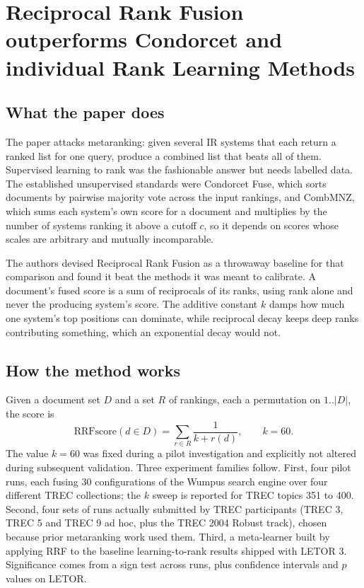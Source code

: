 \section{Reciprocal Rank Fusion outperforms Condorcet and individual Rank Learning Methods}

\subsection{What the paper does}

The paper attacks metaranking: given several IR systems that each return a ranked list for one query, produce a combined list that beats all of them. Supervised learning to rank was the fashionable answer but needs labelled data. The established unsupervised standards were Condorcet Fuse, which sorts documents by pairwise majority vote across the input rankings, and CombMNZ, which sums each system's own score for a document and multiplies by the number of systems ranking it above a cutoff $c$, so it depends on scores whose scales are arbitrary and mutually incomparable.

The authors devised Reciprocal Rank Fusion as a throwaway baseline for that comparison and found it beat the methods it was meant to calibrate. A document's fused score is a sum of reciprocals of its ranks, using rank alone and never the producing system's score. The additive constant $k$ damps how much one system's top positions can dominate, while reciprocal decay keeps deep ranks contributing something, which an exponential decay would not.

\subsection{How the method works}

Given a document set $D$ and a set $R$ of rankings, each a permutation on $1..|D|$, the score is
\[ \mathrm{RRFscore}(d \in D) = \sum_{r \in R} \frac{1}{k + r(d)}, \qquad k = 60 . \]
The value $k=60$ was fixed during a pilot investigation and explicitly not altered during subsequent validation. Three experiment families follow. First, four pilot runs, each fusing 30 configurations of the Wumpus search engine over four different TREC collections; the $k$ sweep is reported for TREC topics 351 to 400. Second, four sets of runs actually submitted by TREC participants (TREC 3, TREC 5 and TREC 9 ad hoc, plus the TREC 2004 Robust track), chosen because prior metaranking work used them. Third, a meta-learner built by applying RRF to the baseline learning-to-rank results shipped with LETOR 3. Significance comes from a sign test across runs, plus confidence intervals and $p$ values on LETOR.

